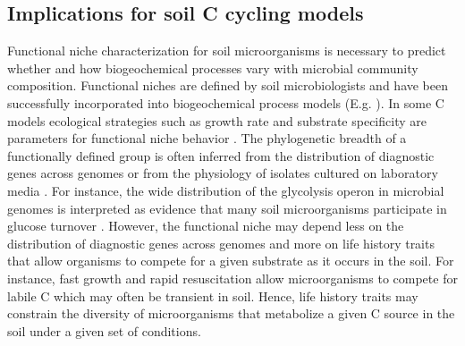 \subsection{Implications for soil C cycling models}
Functional niche characterization for soil microorganisms is necessary to
predict whether and how biogeochemical processes vary with microbial community
composition. Functional niches are defined by soil microbiologists and have
been successfully incorporated into biogeochemical process models (E.g.
\citep{wieder_2014a,Kaiser2014a}). In some C models ecological strategies such
as growth rate and substrate specificity are parameters for functional niche
behavior \citep{Kaiser2014a}. The phylogenetic breadth of a functionally
defined group is often inferred from the distribution of diagnostic genes
across genomes \citep{Berlemont2013} or from the physiology of isolates
cultured on laboratory media \citep{Martiny2013}. For instance, the wide
distribution of the glycolysis operon in microbial genomes is interpreted
as evidence that many soil microorganisms participate in glucose turnover
\citep{McGuire2010}. However, the functional niche may depend less on the
distribution of diagnostic genes across genomes and more on life history
traits that allow organisms to compete for a given substrate as it occurs
in the soil. For instance, fast growth and rapid resuscitation allow
microorganisms to compete for labile C which may often be transient in
soil. Hence, life history traits may constrain the diversity of microorganisms
that metabolize a given C source in the soil under a given set of
conditions.

